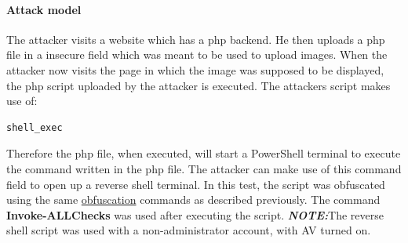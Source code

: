 \documentclass{article}%
\begin{document}
\paragraph{Attack model}\hfill
\newline
The attacker visits a website which has a php backend. He then uploads a php file in a insecure field which was meant to be used to upload images. When the attacker now visits the page in which the image was supposed to be displayed, the php script uploaded by the attacker is executed. The attackers script makes use of:
\begin{verbatim}shell_exec\end{verbatim}
Therefore the php file, when executed, will start a PowerShell terminal to execute the command written in the php file. The attacker can make use of this command field to open up a reverse shell terminal. In this test, the script was obfuscated using the same \hyperlink{obfuscation}{obfuscation} commands as described previously. The command \textbf{Invoke-ALLChecks} was used after executing the script. 
\newline\newline
\textit{\textbf{NOTE:}}The reverse shell script was used with a non-administrator account, with AV turned on.
\newline
\end{document}
